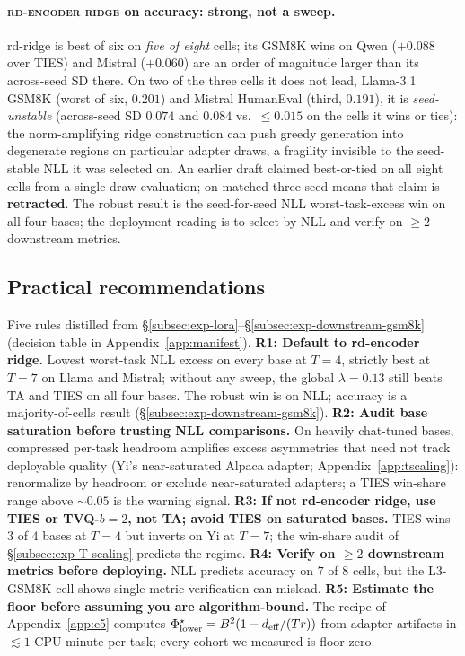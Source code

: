 \paragraph{\textsc{rd-encoder ridge} on accuracy: strong, not a
sweep.} rd-ridge is best of six on \emph{five of eight} cells; its
GSM8K wins on Qwen ($+0.088$ over TIES) and Mistral ($+0.060$) are an
order of magnitude larger than its across-seed SD there. On two of the
three cells it does not lead, Llama-3.1 GSM8K (worst of six,
$0.201$) and Mistral HumanEval (third, $0.191$), it is
\emph{seed-unstable} (across-seed SD $0.074$ and $0.084$ vs.\
$\leq 0.015$ on the cells it wins or ties): the norm-amplifying ridge
construction can push greedy generation into degenerate regions on
particular adapter draws, a fragility invisible to the seed-stable NLL
it was selected on. An earlier draft claimed best-or-tied on all eight
cells from a single-draw evaluation; on matched three-seed means that
claim is \textbf{retracted}. The robust result is the seed-for-seed
NLL worst-task-excess win on all four bases; the deployment reading is
to select by NLL and verify on $\geq 2$ downstream metrics.

\subsection{Practical recommendations}
\label{sec:practical-recommendations}

Five rules distilled from
\S\ref{subsec:exp-lora}--\S\ref{subsec:exp-downstream-gsm8k}
(decision table in Appendix~\ref{app:manifest}).
\textbf{R1: Default to rd-encoder ridge.} Lowest worst-task NLL
excess on every base at $T = 4$, strictly best at $T = 7$ on Llama and
Mistral; without any sweep, the global $\lambda = 0.13$ still beats TA
and TIES on all four bases. The robust
win is on NLL; accuracy is a majority-of-cells result
(\S\ref{subsec:exp-downstream-gsm8k}). \textbf{R2: Audit base saturation before
trusting NLL comparisons.} On heavily chat-tuned bases, compressed
per-task headroom amplifies excess asymmetries that need not track
deployable quality (Yi's near-saturated Alpaca adapter;
Appendix~\ref{app:tscaling}): renormalize by headroom or exclude
near-saturated adapters; a TIES win-share range above $\sim 0.05$ is
the warning signal.
\textbf{R3: If not rd-encoder ridge, use TIES or TVQ-$b{=}2$, not
TA; avoid TIES on saturated bases.} TIES wins $3$ of $4$ bases
at $T = 4$ but inverts on Yi at $T = 7$; the win-share audit of
\S\ref{subsec:exp-T-scaling} predicts the regime.
\textbf{R4: Verify on $\geq 2$ downstream metrics before
deploying.} NLL predicts accuracy on $7$ of $8$ cells, but the
L3-GSM8K cell shows single-metric verification can mislead.
\textbf{R5: Estimate the floor before assuming you are
algorithm-bound.} The recipe of Appendix~\ref{app:e5} computes
$\Phi^\star_{\mathrm{lower}} = B^2(1 - d_{\mathrm{eff}}/(Tr))$ from adapter
artifacts in $\lesssim 1$ CPU-minute per task; every cohort we
measured is floor-zero.

